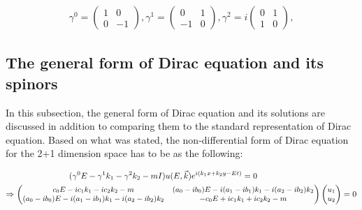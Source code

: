 \documentclass[twocolumn,aps,prb,showpacs]{revtex4-1}
\begin{document}
\begin{align}
	\gamma^{0}=
	\begin{pmatrix}
		1 & 0 \\
		0 & -1
	\end{pmatrix},
	\gamma^{1}=
	\begin{pmatrix}
		0 & 1 \\
		-1 & 0
	\end{pmatrix},
	\gamma^{2}=i
	\begin{pmatrix}
		0 & 1 \\
		1 & 0
	\end{pmatrix}, 
\end{align}



\subsection{The general form of Dirac equation and its spinors}
In this subsection, the general form of Dirac equation and its solutions are discussed in addition to comparing them to the standard representation of Dirac equation. 
Based on what was stated, the non-differential form of Dirac equation for the 2+1 dimension space has to be as the following:
\begin{table*}
	\begin{align}
		(\gamma^{0}E-\gamma^{1}k_{1}-\gamma^{2}k_{2}-mI)u(E,\vec{k})e^{i(k_{1}x+k_{2}y-Et)}=0
		\notag \ \ \ \ \ \ \ \ \ \ \ \ \ \ \ \ \  \ \ \ \ \ \ \ \ \ \ \ \ \ \ \ \ \  \ \  
		\\{\small \Rightarrow
			\begin{pmatrix}
				c_{0}E -i c_{1}k_{1} -i c_{2}k_{2}-m & (a_{0}-ib_{0})E-i(a_{1}-ib_{1})k_{1}-i(a_{2}-ib_{2})k_{2} \\
				(a_{0}-ib_{0})E-i(a_{1}-ib_{1})k_{1}-i(a_{2}-ib_{2})k_{2} &	-c_{0}E +i c_{1}k_{1} +i c_{2}k_{2}-m
			\end{pmatrix}
			\begin{pmatrix}
				u_{1} \\ u_{2}
			\end{pmatrix}=0}
	\end{align}
\end{table*}
\end{document}
